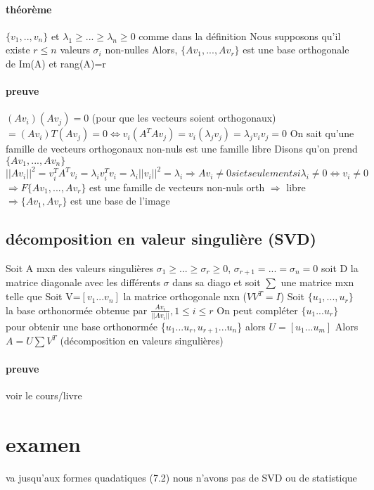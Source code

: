 \documentclass[a4paper,10pt]{article}
\begin{document}
\paragraph{théorème}
$\{v_1,..,v_n\}$ et $\lambda_1\geq ...\geq \lambda_n\geq 0$ comme dans la définition
\newline
Nous supposons qu'il existe $r\leq n$ valeurs $\sigma_i$ non-nulles
\newline
Alors, $\{Av_1,...,Av_r\}$ est une base orthogonale de Im(A) et rang(A)=r
\paragraph{preuve}
$(Av_i)(Av_j)=0$ (pour que les vecteurs soient orthogonaux)
\newline
$=(Av_i)T(Av_j)=0\Leftrightarrow v_i(A^TAv_j)=v_i(\lambda_jv_j)=\lambda_jv_iv_j=0$
\newline
On sait qu'une famille de vecteurs orthogonaux non-nuls est une famille libre
\newline
Disons qu'on prend $\{Av_1,...,Av_n\}$ $||Av_i||^2=v_i^TA^Tv_i=\lambda_iv_i^Tv_i=\lambda_i||v_i||^2=\lambda_i\Rightarrow Av_i\neq 0 si et seulement si \lambda_i\neq0\Leftrightarrow v_i\neq 0$
\newline
$\Rightarrow F\{Av_1,...,Av_r\}$ est une famille de vecteurs non-nuls orth $\Rightarrow$ libre$\Rightarrow\{Av_1,Av_r\}$ est une base de l'image
\subsection{décomposition en valeur singulière (SVD)}
Soit A mxn des valeurs singulières $\sigma_1\geq ...\geq \sigma_r\geq 0$, $\sigma_{r+1}=...=\sigma_n=0$
\newline
soit D la matrice diagonale avec les différents $\sigma$ dans sa diago
\newline
et soit $\sum$ une matrice mxn telle que 
\newline
Soit V=$[v_1...v_n]$ la matrice orthogonale nxn ($VV^T=I$)
\newline
Soit $\{u_1,...,u_r\}$ la base orthonormée obtenue par $\frac{Av_i}{||Av_i||},1\leq i\leq r$
\newline
On peut compléter $\{u_1...u_r\}$ pour obtenir une base orthonormée \{$u_1...u_r,u_{r+1}...u_n$\}
\newline
alors $U=[u_1...u_m]$
\newline
Alors $A=U\sum V^T$ (décomposition en valeurs singulières)
\paragraph{preuve}
voir le cours/livre
\section{examen}
va jusqu'aux formes quadatiques (7.2)
\newline
nous n'avons pas de SVD ou de statistique
\end{document}

